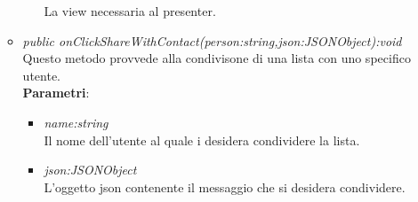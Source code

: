 \begin{itemize}
\begin{itemize}
\begin{itemize}
			La view necessaria al presenter.
					\end{itemize} 
	\item \textit{public onClickShareWithContact(person:string,json:JSONObject):void}\\
	Questo metodo provvede alla condivisone di una lista con uno specifico utente.
					\\ \textbf{Parametri}: \begin{itemize}
			\item \textit{name:string}\\
			Il nome dell'utente al quale i desidera condividere la lista.
			\item \textit{json:JSONObject}\\
			L'oggetto json contenente il messaggio che si desidera condividere.
					\end{itemize} 
	\end{itemize}
\end{itemize} 
 
 
